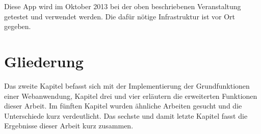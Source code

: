Diese App wird im Oktober 2013 bei der oben beschriebenen Veranstaltung getestet und verwendet werden. Die dafür nötige Infrastruktur ist vor Ort gegeben.

\section{Gliederung}
Das zweite Kapitel befasst sich mit der Implementierung der Grundfunktionen einer Webanwendung, Kapitel drei und vier erläutern die erweiterten Funktionen dieser Arbeit. Im fünften Kapitel wurden ähnliche Arbeiten gesucht und die Unterschiede kurz verdeutlicht. Das sechste und damit letzte Kapitel fasst die Ergebnisse dieser Arbeit kurz zusammen. 
